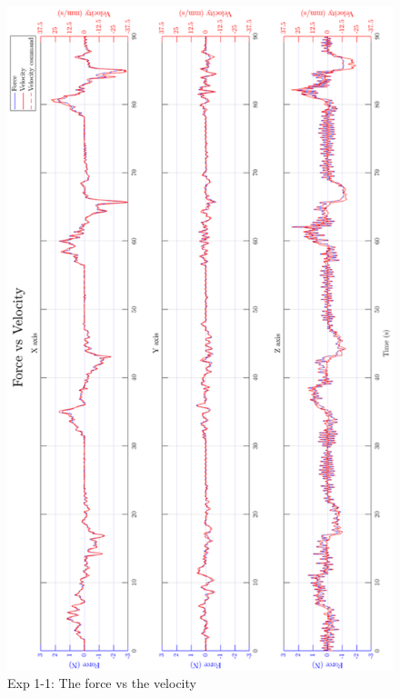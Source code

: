 \begin{figure}[htbp]
\begin{center}
\includegraphics[width=0.9\linewidth]{Images/exp/exp1_2_2.png}
\caption{Exp 1-1: The force vs the velocity}
\label{fig: exp1_2_2}
\end{center}
\end{figure}

